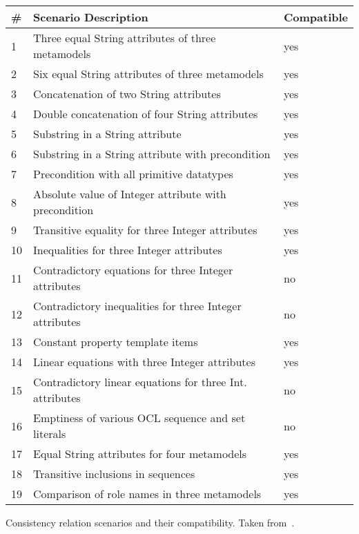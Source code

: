 \begin{propertable}
    \renewcommand{\arraystretch}{1.2}%
    \begin{tabular}{L{1.4em} L{22.5em} C{5.7em}}
        \toprule
        \textbf{\#} & \textbf{Scenario Description} & \textbf{Compatible} \\
         & Three equal String attributes of three metamodels & yes\\
        2 & Six equal String attributes of three metamodels & yes\\
        3 & Concatenation of two String attributes & yes\\
        4 & Double concatenation of four String attributes & yes\\
        5 & Substring in a String attribute & yes\\
        6 & Substring in a String attribute with precondition & yes\\
        7 & Precondition with all primitive datatypes & yes\\
        8 & Absolute value of Integer attribute with precondition & yes\\
        9 & Transitive equality for three Integer attributes & yes\\
        10 & Inequalities for three Integer attributes & yes\\
        11 & Contradictory equations for three Integer attributes & no\\
        12 & Contradictory inequalities for three Integer attributes & no\\
        13 & Constant property template items & yes\\
        14 & Linear equations with three Integer attributes & yes\\
        15 & Contradictory linear equations for three Int. attributes & no\\
        16 & Emptiness of various \gls{OCL} sequence and set literals & no\\
        17 & Equal String attributes for four metamodels & yes\\
        18 & Transitive inclusions in sequences & yes\\
        19 & Comparison of role names in three metamodels & yes\\
        \bottomrule
    \end{tabular}
    \caption[Example scenarios with compatibility classification]{Consistency relation scenarios and their compatibility. Taken from~.}
    \label{tab:correctness_evaluation:compatibility_scenarios}
\end{propertable}

